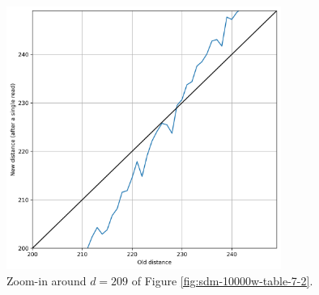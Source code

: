 \begin{figure}[!htb]
\centering\includegraphics[width=0.8\textwidth]{./images02/sdm-10000w-zoom-209.png}
\caption{Zoom-in around $d=209$ of Figure \ref{fig:sdm-10000w-table-7-2}.
\label{fig:sdm-10000w-zoom}
}
\end{figure}



